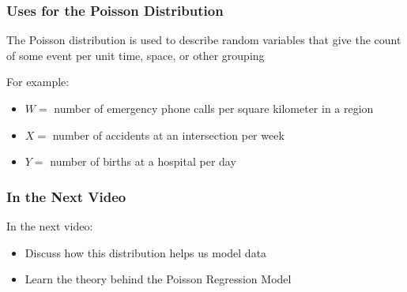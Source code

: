 \documentclass{beamer}
\begin{document}
\begin{frame}[fragile]\frametitle{Uses for the Poisson Distribution}

	The Poisson distribution is used to describe random variables that give the count of some event per unit time, space, or other grouping
	
	For example:
	\begin{itemize}

		\item $W =$ number of emergency phone calls per square kilometer in a region
	
		\item $X =$ number of accidents at an intersection per week
		
		\item $Y =$ number of births at a hospital per day
	
	\end{itemize}

\end{frame}



\begin{frame}[fragile]\frametitle{In the Next Video}

	In the next video:
	\begin{itemize}

		\item Discuss how this distribution helps us model data
		
		\item Learn the theory behind the Poisson Regression Model
	
	\end{itemize}

\end{frame}
\end{document}
